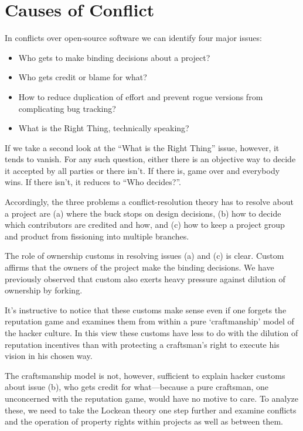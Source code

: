 \section{Causes of Conflict}

In conflicts over open-source software we can identify four major issues:
\begin{itemize}
\item Who gets to make binding decisions about a project?
\item Who gets credit or blame for what?
\item How to reduce duplication of effort and prevent rogue versions from
  complicating bug tracking?
\item What is the Right Thing, technically speaking?
\end{itemize}
If we take a second look at the ``What is the Right Thing'' issue, however, it
tends to vanish.  For any such question, either there is an objective way to
decide it accepted by all parties or there isn't.  If there is, game over and
everybody wins.  If there isn't, it reduces to ``Who decides?''.

Accordingly, the three problems a conflict-resolution theory has to resolve
about a project are (a) where the buck stops on design decisions, (b) how to
decide which contributors are credited and how, and (c) how to keep a project
group and product from fissioning into multiple branches.

The role of ownership customs in resolving issues (a) and (c) is clear.  Custom
affirms that the owners of the project make the binding decisions.  We have
previously observed that custom also exerts heavy pressure against dilution of
ownership by forking.

It's instructive to notice that these customs make sense even if one forgets the
reputation game and examines them from within a pure `craftmanship' model of the
hacker culture.  In this view these customs have less to do with the dilution of
reputation incentives than with protecting a craftsman's right to execute his
vision in his chosen way.

The craftsmanship model is not, however, sufficient to explain hacker customs
about issue (b), who gets credit for what—because a pure craftsman, one
unconcerned with the reputation game, would have no motive to care.  To analyze
these, we need to take the Lockean theory one step further and examine conflicts
and the operation of property rights within projects as well as between them.

